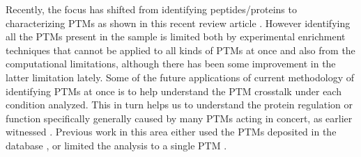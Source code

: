 \documentclass[12pt]{article}
\begin{document}
Recently, the focus has shifted from identifying peptides/proteins to characterizing PTMs as shown in this recent review article \cite{OlsenMann2013}. However identifying all the PTMs present in the sample is limited both by experimental enrichment techniques that cannot be applied to all kinds of PTMs at once and also from the computational limitations, although there has been some improvement in the latter limitation lately. Some of the future applications of current methodology of identifying PTMs at once is to help understand the PTM crosstalk under each condition analyzed. This in turn helps us to understand the protein regulation or function specifically generally caused by many PTMs acting in concert, as earlier witnessed \cite{Pengetal2014}. Previous work in this area either used the PTMs deposited in the database \cite{Guptaetal2007}, or limited the analysis to a single PTM \cite{Soaresetal2013}.

\end{document}
